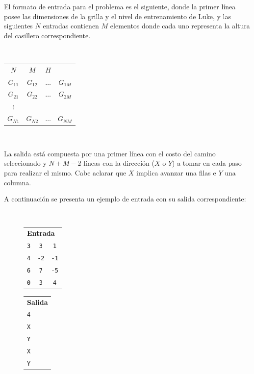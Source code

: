 	El formato de entrada para el problema es el siguiente, donde la primer
	línea posee las dimensiones de la grilla y el nivel de entrenamiento de
	Luke, y las siguientes $N$ entradas contienen $M$ elementos donde cada uno
	representa la altura del casillero correspondiente.

	~
	\begin{center}
		\begin{tabular}{cccc}
			$N$ & $M$ & $H$ & \\
			$G_{11}$ & $G_{12}$ & $\dots$ & $G_{1M}$ \\
			$G_{21}$ & $G_{22}$ & $\dots$ & $G_{2M}$ \\
			$\vdots$ & & & \\
			$G_{N1}$ & $G_{N2}$ & $\dots$ & $G_{NM}$ \\
		\end{tabular}
	\end{center}

	~

	La salida está compuesta por una primer línea con el costo del camino
	seleccionado y $N + M - 2$ líneas con la dirección ($X$ o $Y$) a tomar en cada paso para
	realizar el mismo. Cabe aclarar que $X$ implica avanzar una filas e $Y$
	una columna.

	A continuación se presenta un ejemplo de entrada con su salida
	correspondiente:

	~

	\begin{figure}[H]
		\centering
		\begin{minipage}[t]{0.25\textwidth}
			\begin{tabular}[t]{ccc}
				\multicolumn{3}{l}{\textbf{Entrada}} \\
				\texttt{3} & \texttt{3} & \texttt{1} \\
				\texttt{4} & \texttt{-2} & \texttt{-1} \\
				\texttt{6} & \texttt{7} & \texttt{-5} \\
				\texttt{0} & \texttt{3} & \texttt{4} \\
			\end{tabular}
		\end{minipage}
		\begin{minipage}[t]{0.10\textwidth}
			\begin{tabular}[t]{l}
				\textbf{Salida} \\
				\texttt{4} \\
				\texttt{X} \\
				\texttt{Y} \\
				\texttt{X} \\
				\texttt{Y} \\
			\end{tabular}
		\end{minipage}
	\end{figure}

